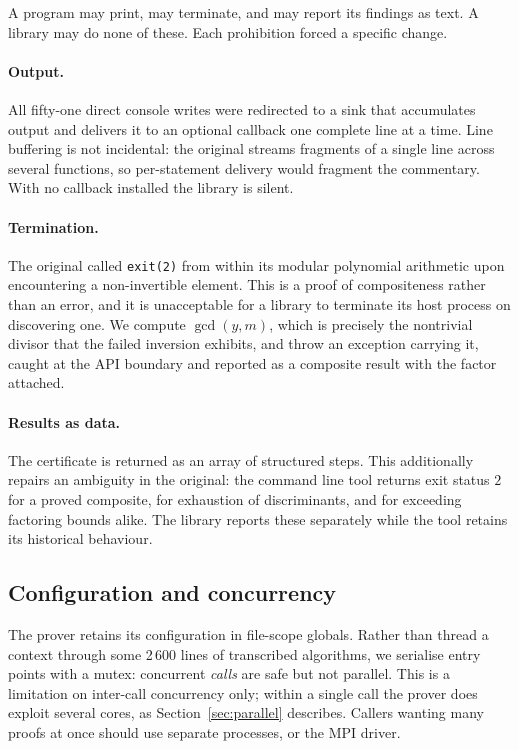 \documentclass[11pt,a4paper]{article}
\newcommand{\code}[1]{\texttt{#1}}
\begin{document}
A program may print, may terminate, and may report its findings as text.
A library may do none of these. Each prohibition forced a specific change.

\paragraph{Output.} All fifty-one direct console writes were redirected
to a sink that accumulates output and delivers it to an optional callback
one complete line at a time. Line buffering is not incidental: the
original streams fragments of a single line across several functions, so
per-statement delivery would fragment the commentary. With no callback
installed the library is silent.

\paragraph{Termination.} The original called \code{exit(2)} from within
its modular polynomial arithmetic upon encountering a non-invertible
element. This is a proof of compositeness rather than an error, and it is
unacceptable for a library to terminate its host process on discovering
one. We compute $\gcd(y, m)$, which is precisely the nontrivial divisor
that the failed inversion exhibits, and throw an exception carrying it,
caught at the API boundary and reported as a composite result with the
factor attached.

\paragraph{Results as data.} The certificate is returned as an array of
structured steps. This additionally repairs an ambiguity in the original:
the command line tool returns exit status $2$ for a proved composite, for
exhaustion of discriminants, and for exceeding factoring bounds alike.
The library reports these separately while the tool retains its
historical behaviour.

\subsection{Configuration and concurrency}

The prover retains its configuration in file-scope globals. Rather than
thread a context through some 2\,600 lines of transcribed algorithms, we
serialise entry points with a mutex: concurrent \emph{calls} are safe but
not parallel. This is a limitation on inter-call concurrency only; within
a single call the prover does exploit several cores, as
Section~\ref{sec:parallel} describes. Callers wanting many proofs at once
should use separate processes, or the MPI driver.
\end{document}
